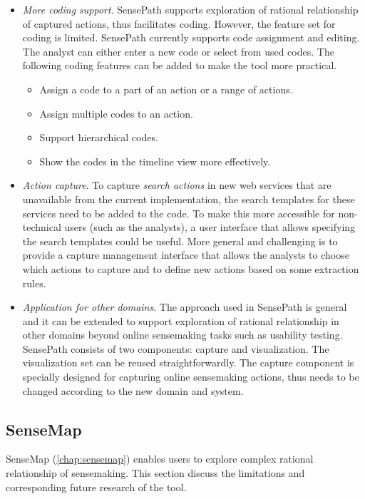 \begin{itemize}
	\item \emph{More coding support}. SensePath supports exploration of rational relationship of captured actions, thus facilitates coding. However, the feature set for coding is limited. SensePath currently supports code assignment and editing. The analyst can either enter a new code or select from used codes. The following coding features can be added to make the tool more practical.
	\begin{itemize}
		\item Assign a code to a part of an action or a range of actions.
		\item Assign multiple codes to an action.
		\item Support hierarchical codes.
		\item Show the codes in the timeline view more effectively.
	\end{itemize}
	
	\item \emph{Action capture}. To capture \emph{search actions} in new web services that are unavailable from the current implementation, the search templates for these services need to be added to the code. To make this more accessible for non-technical users (such as the analysts), a user interface that allows specifying the search templates could be useful. More general and challenging is to provide a capture management interface that allows the analysts to choose which actions to capture and to define new actions based on some extraction rules.

	\item \emph{Application for other domains}. The approach used in SensePath is general and it can be extended to support exploration of rational relationship in other domains beyond online sensemaking tasks such as usability testing. SensePath consists of two components: capture and visualization. The visualization set can be reused straightforwardly. The capture component is specially designed for capturing online sensemaking actions, thus needs to be changed according to the new domain and system.
\end{itemize}


\subsection{SenseMap}
SenseMap (\autoref{chap:sensemap}) enables users to explore complex rational relationship of sensemaking. This section discuss the limitations and corresponding future research of the tool.

